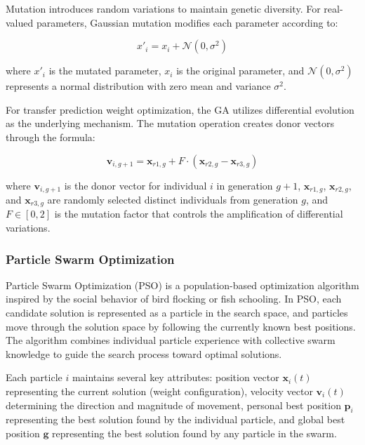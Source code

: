 Mutation introduces random variations to maintain genetic diversity. For real-valued parameters, Gaussian mutation modifies each parameter according to:

\begin{equation}
x'_i = x_i + \mathcal{N}(0, \sigma^2)
\end{equation}

where $x'_i$ is the mutated parameter, $x_i$ is the original parameter, and $\mathcal{N}(0, \sigma^2)$ represents a normal distribution with zero mean and variance $\sigma^2$.

For transfer prediction weight optimization, the GA utilizes differential evolution as the underlying mechanism. The mutation operation creates donor vectors through the formula:

\begin{equation}
\mathbf{v}_{i,g+1} = \mathbf{x}_{r1,g} + F \cdot (\mathbf{x}_{r2,g} - \mathbf{x}_{r3,g})
\end{equation}

where $\mathbf{v}_{i,g+1}$ is the donor vector for individual $i$ in generation $g+1$, $\mathbf{x}_{r1,g}$, $\mathbf{x}_{r2,g}$, and $\mathbf{x}_{r3,g}$ are randomly selected distinct individuals from generation $g$, and $F \in [0,2]$ is the mutation factor that controls the amplification of differential variations.

\subsubsection{Particle Swarm Optimization}

Particle Swarm Optimization (PSO) is a population-based optimization algorithm inspired by the social behavior of bird flocking or fish schooling. In PSO, each candidate solution is represented as a particle in the search space, and particles move through the solution space by following the currently known best positions. The algorithm combines individual particle experience with collective swarm knowledge to guide the search process toward optimal solutions.

Each particle $i$ maintains several key attributes: position vector $\mathbf{x}_i(t)$ representing the current solution (weight configuration), velocity vector $\mathbf{v}_i(t)$ determining the direction and magnitude of movement, personal best position $\mathbf{p}_i$ representing the best solution found by the individual particle, and global best position $\mathbf{g}$ representing the best solution found by any particle in the swarm.

